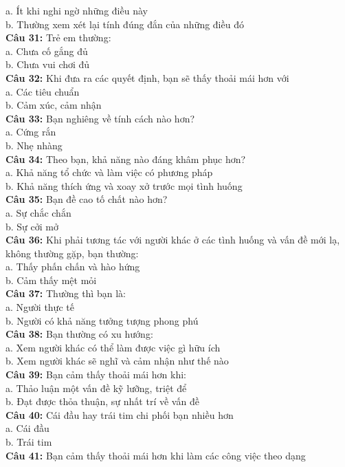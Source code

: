 \begin{multicols}{2}
a. Ít khi nghi ngờ những điều này \\
b. Thường xem xét lại tính đúng đắn của những điều đó \\
\textbf{Câu 31:} Trẻ em thường: \\
a. Chưa cố gắng đủ \\
b. Chưa vui chơi đủ \\
\textbf{Câu 32:} Khi đưa ra các quyết định, bạn sẽ thấy thoải mái hơn với \\
a. Các tiêu chuẩn \\
b. Cảm xúc, cảm nhận \\
\textbf{Câu 33:} Bạn nghiêng về tính cách nào hơn? \\
a. Cứng rắn \\
b. Nhẹ nhàng \\
\textbf{Câu 34:} Theo bạn, khả năng nào đáng khâm phục hơn? \\
a. Khả năng tổ chức và làm việc có phương pháp \\
b. Khả năng thích ứng và xoay xở trước mọi tình huống \\
\textbf{Câu 35:} Bạn đề cao tố chất nào hơn? \\
a. Sự chắc chắn \\
b. Sự cởi mở \\
\textbf{Câu 36:} Khi phải tương tác với người khác ở các tình huống và vấn đề mới lạ, không thường gặp, bạn thường: \\
a. Thấy phấn chấn và hào hứng \\
b. Cảm thấy mệt mỏi \\
\textbf{Câu 37:} Thường thì bạn là: \\
a. Người thực tế \\
b. Người có khả năng tưởng tượng phong phú \\
\textbf{Câu 38:} Bạn thường có xu hướng: \\
a. Xem người khác có thể làm được việc gì hữu ích \\
b. Xem người khác sẽ nghĩ và cảm nhận như thế nào \\
\textbf{Câu 39:} Bạn cảm thấy thoải mái hơn khi: \\
a. Thảo luận một vấn đề kỹ lưỡng, triệt để \\
b. Đạt được thỏa thuận, sự nhất trí về vấn đề \\
\textbf{Câu 40:} Cái đầu hay trái tim chi phối bạn nhiều hơn \\
a. Cái đầu \\
b. Trái tim \\
\textbf{Câu 41:} Bạn cảm thấy thoải mái hơn khi làm các công việc theo dạng \\

\end{multicols}
